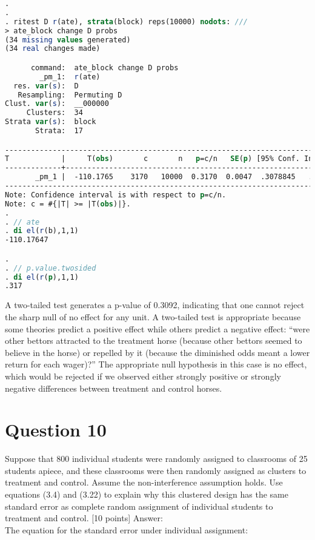 \documentclass[11pt,notitlepage]{article}\usepackage[]{graphicx}\usepackage[]{color}
\begin{document}
\begin{enumerate}[a)]
\begin{lstlisting}[language=stata]
. 
. 
. ritest D r(ate), strata(block) reps(10000) nodots: ///
> ate_block change D probs
(34 missing values generated)
(34 real changes made)

      command:  ate_block change D probs
        _pm_1:  r(ate)
  res. var(s):  D
   Resampling:  Permuting D
Clust. var(s):  __000000
     Clusters:  34
Strata var(s):  block
       Strata:  17

------------------------------------------------------------------------------
T            |     T(obs)       c       n   p=c/n   SE(p) [95% Conf. Interval]
-------------+----------------------------------------------------------------
       _pm_1 |  -110.1765    3170   10000  0.3170  0.0047  .3078845   .3262222
------------------------------------------------------------------------------
Note: Confidence interval is with respect to p=c/n.
Note: c = #{|T| >= |T(obs)|}. 
. 
. // ate
. di el(r(b),1,1)
-110.17647

. 
. // p.value.twosided
. di el(r(p),1,1)
.317
\end{lstlisting}


A two-tailed test generates a p-value of 0.3092, indicating that one cannot reject the sharp null of no effect for any unit. A two-tailed test is appropriate because some theories predict a positive effect while others predict a negative effect: ``were other bettors attracted to the treatment horse (because other bettors seemed to believe in the horse) or repelled by it (because the diminished odds meant a lower return for each wager)?''  The appropriate null hypothesis in this case is no effect, which would be rejected if we observed either strongly positive or strongly negative differences between treatment and control horses.
\end{enumerate}

\section*{Question 10}
Suppose that 800 individual students were randomly assigned to classrooms of 25 students apiece, and these classrooms were then randomly assigned as clusters to treatment and control. Assume the non-interference assumption holds. Use equations (3.4) and (3.22) to explain why this clustered design has the same standard error as complete random assignment of individual students to treatment and control. [10 points]
Answer:\\

The equation for the standard error under individual assignment:
\end{document}
